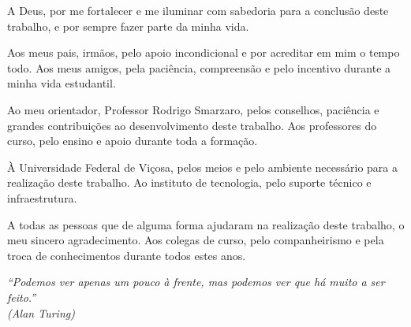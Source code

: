 \documentclass[
    12pt,                   %
    openright,              %
    oneside,                %
    a4paper,                %
    sumario=tradicional,    %
    english,                %
    brazil,                 %
    ]{abntex2}
\begin{document}
\frenchspacing

\pretextual

\imprimircapa

\imprimirfolhaderosto

\imprimirfolhadeaprovacao



\begin{agradecimentos}
    
    A Deus, por me fortalecer e me iluminar com sabedoria para a conclusão deste trabalho, e por sempre fazer parte da minha vida.
    
    Aos meus pais, irmãos, pelo apoio incondicional e por acreditar em mim o tempo todo.
    Aos meus amigos, pela paciência, compreensão e pelo incentivo durante a minha vida estudantil.

    Ao meu orientador, Professor Rodrigo Smarzaro, pelos conselhos, paciência e grandes contribuições ao desenvolvimento deste trabalho.
    Aos professores do curso, pelo ensino e apoio durante toda a formação.
    
    À Universidade Federal de Viçosa, pelos meios e pelo ambiente necessário para a realização deste trabalho.
    Ao instituto de tecnologia, pelo suporte técnico e infraestrutura.
    
    A todas as pessoas que de alguma forma ajudaram na realização deste trabalho, o meu sincero agradecimento.
    Aos colegas de curso, pelo companheirismo e pela troca de conhecimentos durante todos estes anos.

\end{agradecimentos}

\begin{epigrafe}

    \vspace*{\fill}
    \begin{flushright}
        \textit{``Podemos ver apenas um pouco à frente, mas podemos ver que há muito a ser feito.''\\
        (Alan Turing)}
    \end{flushright}
\end{epigrafe}
\end{document}

